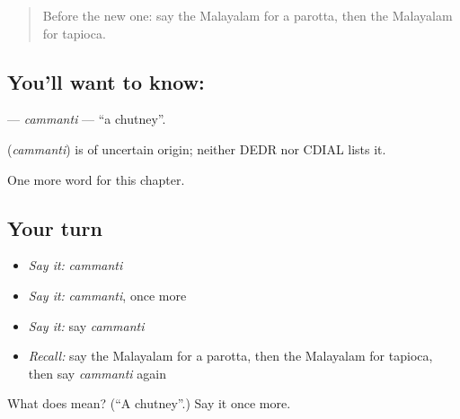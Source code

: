 \label{lesson:ML-C322-cammanti}



\begin{quote}
Before the new one: say the Malayalam for a parotta, then the Malayalam for tapioca.
\end{quote}

\subsection*{You'll want to know: }
\textbf{} — \emph{cammanti} — \textquotedblleft{}a chutney\textquotedblright{}.

\begin{cousinweb}
\textbf{} (\emph{cammanti}) is of uncertain origin; neither DEDR nor CDIAL lists it.
\end{cousinweb}

\begin{grammarlens}[title={What you've built}]
One more word for this chapter.
\end{grammarlens}

\subsection*{Your turn}
\begin{itemize}
\raggedright
  \item \emph{Say it:} \emph{cammanti}
  \item \emph{Say it:} \emph{cammanti}, once more
  \item \emph{Say it:} say \emph{cammanti}
  \item \emph{Recall:} say the Malayalam for a parotta, then the Malayalam for tapioca, then say \emph{cammanti} again
\end{itemize}

\begin{tcolorbox}[breakable,colback=teal!4,colframe=teal!35!black,title={Before you move on}]
What does  mean? (\textquotedblleft{}A chutney\textquotedblright{}.) Say it once more.
\end{tcolorbox}
